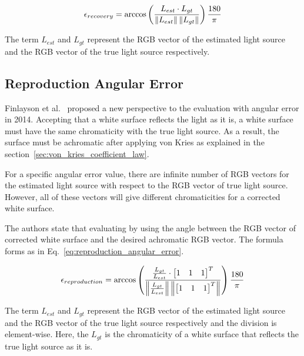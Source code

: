 \begin{equation}
    \epsilon_{recovery} = \arccos\left(\frac{L_{est} \cdot L_{gt}}{\left\lVert L_{est}\right\rVert \left\lVert L_{gt}\right\rVert}\right) \frac{180}{\pi}
    \label{eq:recovery_angular_error}
\end{equation}

The term $L_{est}$ and $L_{gt}$ represent the RGB vector of the estimated light source and the RGB vector of the true light source respectively.

\subsection{Reproduction Angular Error}

Finlayson et al.~\cite{finlaysonReproductionAngularError} proposed a new perspective to the evaluation with angular error in 2014. Accepting that a white surface reflects the light as it is, a white surface must have the same chromaticity with the true light source. As a result, the surface must be achromatic after applying von Kries as explained in the section~\ref{sec:von_kries_coefficient_law}.

For a specific angular error value, there are infinite number of RGB vectors for the estimated light source with respect to the RGB vector of true light source. However, all of these vectors will give different chromaticities for a corrected white surface.

The authors state that evaluating by using the angle between the RGB vector of corrected white surface and the desired achromatic RGB vector. The formula forms as in Eq.~\ref{eq:reproduction_angular_error}.

\begin{equation}
    \epsilon_{reproduction} = \arccos\left(\frac{\frac{L_{gt}}{L_{est}} \cdot \begin{bmatrix} 1 & 1 & 1 \end{bmatrix}^T} {\left\lVert\frac{L_{gt}}{L_{est}}\right\rVert \left\lVert\begin{bmatrix} 1 & 1 & 1 \end{bmatrix}^T\right\rVert}\right) \frac{180}{\pi}
    \label{eq:reproduction_angular_error}
\end{equation}

The term $L_{est}$ and $L_{gt}$ represent the RGB vector of the estimated light source and the RGB vector of the true light source respectively and the division is element-wise. Here, the $L_{gt}$ is the chromaticity of a white surface that reflects the true light source as it is.

